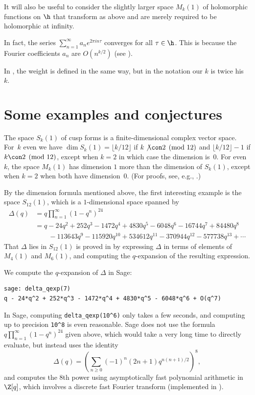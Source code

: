 \documentclass{report}
\begin{document}
It will also be useful to consider the slightly larger space $M_k(1)$ of
holomorphic functions on $\h$ that transform as above and are merely
required to be holomorphic at infinity.

\begin{remark}\label{rmk:allh}
In fact, the series $\sum_{n=1}^\infty a_n e^{2\pi i n\tau}$
converges for all $\tau\in\h$.  This is because the Fourier
coefficients $a_n$ are $O(n^{k/2})$ (see \cite[Cor.~2.1.6, pg.
43]{miyake}).
\end{remark}

\begin{remark}
In \cite[Ch.~7]{serre:arithmetic}, the weight is defined in the
same way, but in the notation our $k$ is twice his~$k$.
\end{remark}


\section{Some examples and conjectures} The space $S_k(1)$ of
cusp forms is a finite-dimensional complex vector space.  For~$k$
even we have $\dim S_k(1) = \lfloor k/12 \rfloor$ if $k\not\con
2\pmod{12}$ and $\lfloor k/12\rfloor-1$ if $k\con 2\pmod{12}$,
except when $k=2$ in which case the dimension is~$0$.  For
even~$k$, the space $M_k(1)$ has dimension $1$ more than the
dimension of $S_k(1)$, except when $k=2$ when both have
dimension~$0$. (For proofs, see, e.g., \cite[Ch.~7,
\S3]{serre:arithmetic}.)

By the dimension formula mentioned above, the first interesting
example is the space $S_{12}(1)$, which is a $1$-dimensional space
spanned by
\begin{align*}
\Delta(q) &= q \prod_{n=1}^{\infty} (1-q^n)^{24}\\
&= q - 24q^2 + 252q^3 - 1472q^4 + 4830q^5 - 6048q^6 - 16744q^7 +
84480q^8 \\
 & \mbox{}\qquad\! - 113643q^9 - 115920q^{10} +
    534612q^{11} - 370944q^{12} - 577738q^{13}
    +\cdots
\end{align*}
That $\Delta$ lies in $S_{12}(1)$ is proved in \cite[Ch.~7,
\S4.4]{serre:arithmetic} by expressing $\Delta$ in terms of
elements of $M_4(1)$ and $M_6(1)$, and computing the $q$-expansion
of the resulting expression.

\begin{example}
We compute the $q$-expansion of $\Delta$ in Sage:
\begin{lstlisting}
sage: delta_qexp(7)
q - 24*q^2 + 252*q^3 - 1472*q^4 + 4830*q^5 - 6048*q^6 + O(q^7)
\end{lstlisting}
In Sage, computing \verb|delta_qexp(10^6)| only takes a few seconds,
and computing up to precision \verb|10^8| is even reasonable.
Sage does not use the formula
$q \prod_{n=1}^{\infty} (1-q^n)^{24}$ given above, which would take
a very long time to directly evaluate, but instead uses the identity
$$
  \Delta(q) = \left( \sum_{n \ge 0} (-1)^n (2n+1) q^{n(n+1)/2}\right)^8,
$$
and computes the 8th power using asymptotically fast polynomial
arithmetic in $\Z[q]$, which involves a discrete fast Fourier
transform (implemented in \cite{flint}).
\end{example}
\end{document}

